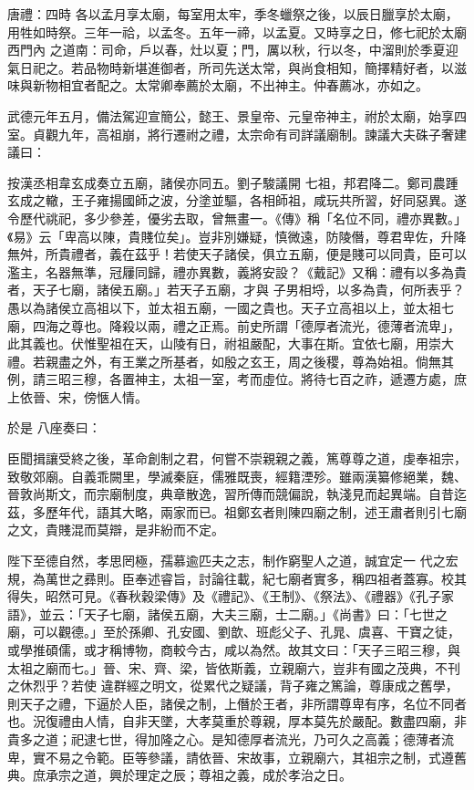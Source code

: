 
\begin{pinyinscope}

 唐禮：四時
 各以孟月享太廟，每室用太牢，季冬蠟祭之後，以辰日臘享於太廟，用牲如時祭。三年一祫，以孟冬。五年一禘，以孟夏。又時享之日，修七祀於太廟西門內
 之道南：司命，戶以春，灶以夏；門，厲以秋，行以冬，中溜則於季夏迎氣日祀之。若品物時新堪進御者，所司先送太常，與尚食相知，簡擇精好者，以滋味與新物相宜者配之。太常卿奉薦於太廟，不出神主。仲春薦冰，亦如之。



 武德元年五月，備法駕迎宣簡公，懿王、景皇帝、元皇帝神主，祔於太廟，始享四室。貞觀九年，高祖崩，將行遷祔之禮，太宗命有司詳議廟制。諫議大夫硃子奢建議曰：



 按漢丞相韋玄成奏立五廟，諸侯亦同五。劉子駿議開
 七祖，邦君降二。鄭司農踵玄成之轍，王子雍揚國師之波，分塗並驅，各相師祖，咸玩共所習，好同惡異。遂令歷代祧祀，多少參差，優劣去取，曾無畫一。《傳》稱「名位不同，禮亦異數。」《易》云「卑高以陳，貴賤位矣」。豈非別嫌疑，慎微遠，防陵僭，尊君卑佐，升降無舛，所貴禮者，義在茲乎！若使天子諸侯，俱立五廟，便是賤可以同貴，臣可以濫主，名器無準，冠屨同歸，禮亦異數，義將安設？《戴記》又稱：禮有以多為貴者，天子七廟，諸侯五廟。」若天子五廟，才與
 子男相埒，以多為貴，何所表乎？愚以為諸侯立高祖以下，並太祖五廟，一國之貴也。天子立高祖以上，並太祖七廟，四海之尊也。降殺以兩，禮之正焉。前史所謂「德厚者流光，德薄者流卑」，此其義也。伏惟聖祖在天，山陵有日，祔祖嚴配，大事在斯。宜依七廟，用崇大禮。若親盡之外，有王業之所基者，如殷之玄王，周之後稷，尊為始祖。倘無其例，請三昭三穆，各置神主，太祖一室，考而虛位。將待七百之祚，遞遷方處，庶上依晉、宋，傍愜人情。



 於是
 八座奏曰：



 臣聞揖讓受終之後，革命創制之君，何嘗不崇親親之義，篤尊尊之道，虔奉祖宗，致敬郊廟。自義乖闕里，學滅秦庭，儒雅既喪，經籍湮殄。雖兩漢纂修絕業，魏、晉敦尚斯文，而宗廟制度，典章散逸，習所傳而競偏說，執淺見而起異端。自昔迄茲，多歷年代，語其大略，兩家而已。祖鄭玄者則陳四廟之制，述王肅者則引七廟之文，貴賤混而莫辯，是非紛而不定。



 陛下至德自然，孝思罔極，孺慕逾匹夫之志，制作窮聖人之道，誠宜定一
 代之宏規，為萬世之彞則。臣奉述睿旨，討論往載，紀七廟者實多，稱四祖者蓋寡。校其得失，昭然可見。《春秋穀梁傳》及《禮記》、《王制》、《祭法》、《禮器》《孔子家語》，並云：「天子七廟，諸侯五廟，大夫三廟，士二廟。」《尚書》曰：「七世之廟，可以觀德。」至於孫卿、孔安國、劉歆、班彪父子、孔晁、虞喜、干寶之徒，或學推碩儒，或才稱博物，商較今古，咸以為然。故其文曰：「天子三昭三穆，與太祖之廟而七。」晉、宋、齊、梁，皆依斯義，立親廟六，豈非有國之茂典，不刊之休烈乎？若使
 違群經之明文，從累代之疑議，背子雍之篤論，尊康成之舊學，則天子之禮，下逼於人臣，諸侯之制，上僭於王者，非所謂尊卑有序，名位不同者也。況復禮由人情，自非天墜，大孝莫重於尊親，厚本莫先於嚴配。數盡四廟，非貴多之道；祀逮七世，得加隆之心。是知德厚者流光，乃可久之高義；德薄者流卑，實不易之令範。臣等參議，請依晉、宋故事，立親廟六，其祖宗之制，式遵舊典。庶承宗之道，興於理定之辰；尊祖之義，成於孝治之日。




\end{pinyinscope}

